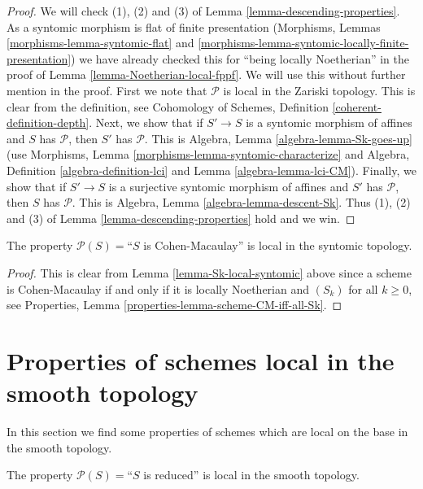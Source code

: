 \begin{proof}
We will check (1), (2) and (3) of Lemma \ref{lemma-descending-properties}.
As a syntomic morphism is flat of finite presentation
(Morphisms, Lemmas \ref{morphisms-lemma-syntomic-flat}
and \ref{morphisms-lemma-syntomic-locally-finite-presentation})
we have already checked this for ``being locally Noetherian'' in the proof
of Lemma \ref{lemma-Noetherian-local-fppf}.
We will use this without further mention in the proof.
First we note that $\mathcal{P}$ is local in the Zariski topology.
This is clear from the definition,
see Cohomology of Schemes, Definition \ref{coherent-definition-depth}.
Next, we show that if $S' \to S$ is a syntomic morphism of affines
and $S$ has $\mathcal{P}$, then $S'$ has $\mathcal{P}$. This
is Algebra, Lemma \ref{algebra-lemma-Sk-goes-up}
(use
Morphisms, Lemma \ref{morphisms-lemma-syntomic-characterize}
and
Algebra, Definition \ref{algebra-definition-lci} and
Lemma \ref{algebra-lemma-lci-CM}).
Finally, we show that if $S' \to S$ is a surjective
syntomic morphism of affines and $S'$ has $\mathcal{P}$,
then $S$ has $\mathcal{P}$. This is
Algebra, Lemma \ref{algebra-lemma-descent-Sk}.
Thus (1), (2) and (3) of Lemma \ref{lemma-descending-properties} hold
and we win.
\end{proof}

\begin{lemma}
\label{lemma-CM-local-syntomic}
The property $\mathcal{P}(S) =$``$S$ is Cohen-Macaulay''
is local in the syntomic topology.
\end{lemma}

\begin{proof}
This is clear from Lemma \ref{lemma-Sk-local-syntomic}
above since a scheme is Cohen-Macaulay if and only if
it is locally Noetherian and $(S_k)$ for all $k \geq 0$, see
Properties, Lemma \ref{properties-lemma-scheme-CM-iff-all-Sk}.
\end{proof}







\section{Properties of schemes local in the smooth topology}
\label{section-descending-properties-smooth}

\noindent
In this section we find some properties of schemes which are local on the base
in the smooth topology.

\begin{lemma}
\label{lemma-reduced-local-smooth}
The property $\mathcal{P}(S) =$``$S$ is reduced'' is local in the smooth
topology.
\end{lemma}

